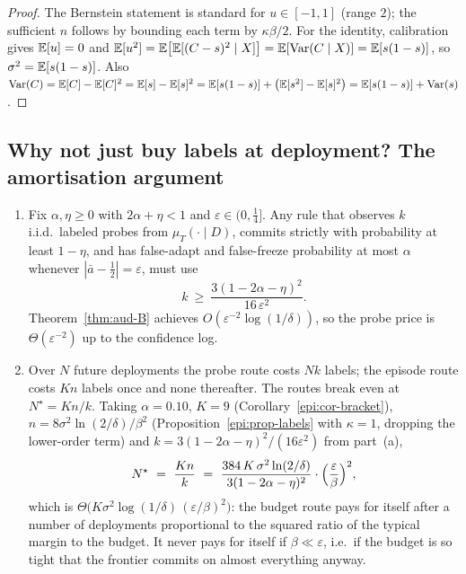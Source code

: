\begin{proof}
The Bernstein statement is standard for $u\in[-1,1]$ (range $2$); the sufficient $n$ follows by
bounding each term by $\kappa\beta/2$. For the identity, calibration gives $\mathbb{E}[u]=0$ and
$\mathbb{E}[u^2]=\mathbb{E}\bigl[\mathbb{E}[(C-s)^2\mid X]\bigr]=\mathbb{E}[\operatorname{Var}(C\mid X)]=\mathbb{E}[s(1-s)]$, so $\sigma^2=\mathbb{E}[s(1-s)]$.
Also $\operatorname{Var}(C)=\mathbb{E}[C]-\mathbb{E}[C]^2=\mathbb{E}[s]-\mathbb{E}[s]^2=\mathbb{E}[s(1-s)]+\bigl(\mathbb{E}[s^2]-\mathbb{E}[s]^2\bigr)
=\mathbb{E}[s(1-s)]+\operatorname{Var}(s)$.
\end{proof}

\subsection{Why not just buy labels at deployment? The amortisation argument}

\begin{proposition}\label{epi:prop-probe}
\begin{enumerate}
\item[\textnormal{(a)}] Fix $\alpha,\eta\ge0$ with $2\alpha+\eta<1$ and $\varepsilon\in(0,\tfrac14]$.
Any rule that observes $k$ i.i.d.\ labeled probes from $\mu_T(\cdot\mid D)$, commits strictly with
probability at least $1-\eta$, and has false-adapt and false-freeze probability at most $\alpha$
whenever $|\bar a-\tfrac12|=\varepsilon$, must use
\[
k\ \ge\ \frac{3(1-2\alpha-\eta)^2}{16\,\varepsilon^{2}} .
\]
Theorem~\ref{thm:aud-B} achieves $O(\varepsilon^{-2}\log(1/\delta))$, so the probe price is
$\Theta(\varepsilon^{-2})$ up to the confidence log.
\item[\textnormal{(b)}] Over $N$ future deployments the probe route costs $Nk$ labels; the episode
route costs $Kn$ labels once and none thereafter. The routes break even at $N^\star=Kn/k$. Taking
$\alpha=0.10$, $K=9$ (Corollary~\ref{epi:cor-bracket}), $n=8\sigma^2\ln(2/\delta)/\beta^2$
(Proposition~\ref{epi:prop-labels} with $\kappa=1$, dropping the lower-order term) and
$k=3(1-2\alpha-\eta)^2/(16\varepsilon^2)$ from part~(a),
\[
\begin{aligned}
N^\star\ =\ \frac{Kn}{k}\ =\ \frac{384\,K\,\sigma^{2}\ln(2/\delta)}{3(1-2\alpha-\eta)^{2}}
\cdot\Bigl(\frac{\varepsilon}{\beta}\Bigr)^{2},
\end{aligned}
\]
which is $\Theta\bigl(K\sigma^2\log(1/\delta)\,(\varepsilon/\beta)^2\bigr)$: the budget route pays
for itself after a number of deployments proportional to the squared ratio of the typical margin to
the budget. It never pays for itself if $\beta\ll\varepsilon$, i.e.\ if the budget is so tight that
the frontier commits on almost everything anyway.
\end{enumerate}
\end{proposition}

